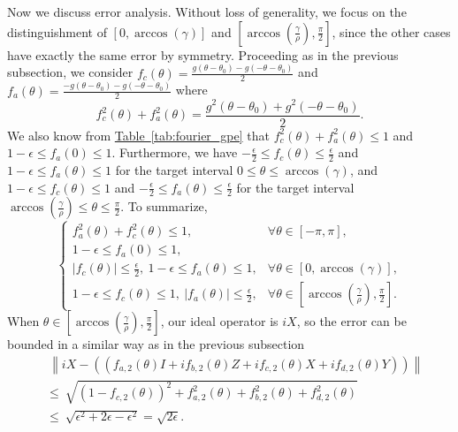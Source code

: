 \documentclass[letterpaper,onecolumn,11pt,accepted=2026-02-14]{quantumarticle}
\newcommand{\abs}[1]{\left\lvert#1\right\rvert}
\newcommand{\norm}[1]{\left\lVert#1\right\rVert}
\theoremstyle{remark}
\theoremstyle{plain}
\newcommand{\tab}[1]{\hyperref[tab:#1]{Table~\ref*{tab:#1}}}
\begin{document}
Now we discuss error analysis. Without loss of generality, we focus on the distinguishment of $\left[0,\arccos\left(\gamma\right)\right]$ and $\left[\arccos\left(\frac{\gamma}{\rho}\right),\frac{\pi}{2}\right]$, since the other cases have exactly the same error by symmetry. Proceeding as in the previous subsection, we consider $f_c(\theta)=\frac{g(\theta-\theta_0)
    -g(-\theta-\theta_0)}{2}$ and $f_a(\theta)=\frac{-g(\theta-\theta_0)
    -g(-\theta-\theta_0)}{2}$ where
\begin{equation}
    f_c^2(\theta)+f_a^2(\theta)=\frac{g^2(\theta-\theta_0)+g^2(-\theta-\theta_0)}{2}.
\end{equation}
We also know from \tab{fourier_gpe} that $f_c^2(\theta)+f_a^2(\theta)\leq1$ and $1-\epsilon\leq f_a(0)\leq1$. Furthermore, we have $-\frac{\epsilon}{2}\leq f_c(\theta)\leq\frac{\epsilon}{2}$ and $1-\epsilon\leq f_a(\theta)\leq1$ for the target interval $0\leq\theta\leq\arccos\left(\gamma\right)$, and $1-\epsilon\leq f_c(\theta)\leq1$ and $-\frac{\epsilon}{2}\leq f_a(\theta)\leq\frac{\epsilon}{2}$ for the target interval $\arccos\left(\frac{\gamma}{\rho}\right)\leq\theta\leq\frac{\pi}{2}$.
To summarize,
\begin{equation}
\begin{cases}
    f_a^2(\theta)+f_c^2(\theta)\leq1,\quad &\forall \theta\in[-\pi,\pi],\\
    1-\epsilon\leq f_a(0)\leq1,\\
    \abs{f_c(\theta)}\leq\frac{\epsilon}{2},\ 1-\epsilon\leq f_a(\theta)\leq1,&\forall\theta\in\left[0,\arccos\left(\gamma\right)\right],\\
    1-\epsilon\leq f_c(\theta)\leq1,\ \abs{f_a(\theta)}\leq\frac{\epsilon}{2},&\forall\theta\in\left[\arccos\left(\frac{\gamma}{\rho}\right),\frac{\pi}{2}\right].
\end{cases}
\end{equation}
When $\theta\in\left[\arccos\left(\frac{\gamma}{\rho}\right),\frac{\pi}{2}\right]$, our ideal operator is $iX$, so the error can be bounded in a similar way as in the previous subsection
\begin{equation}
\begin{aligned}
    &\ \norm{iX-\left(\left(f_{a,2}(\theta)I+if_{b,2}(\theta)Z+if_{c,2}(\theta)X+if_{d,2}(\theta)Y\right)\right)}\\
    &\leq\ \sqrt{
    (1-f_{c,2}(\theta))^2+f_{a,2}^2(\theta)+f_{b,2}^2(\theta)+f_{d,2}^2(\theta)}\\
    &\leq\ \sqrt{\epsilon^2+2\epsilon-\epsilon^2}
    =\sqrt{2\epsilon}.
\end{aligned}
\end{equation}
\end{document}
